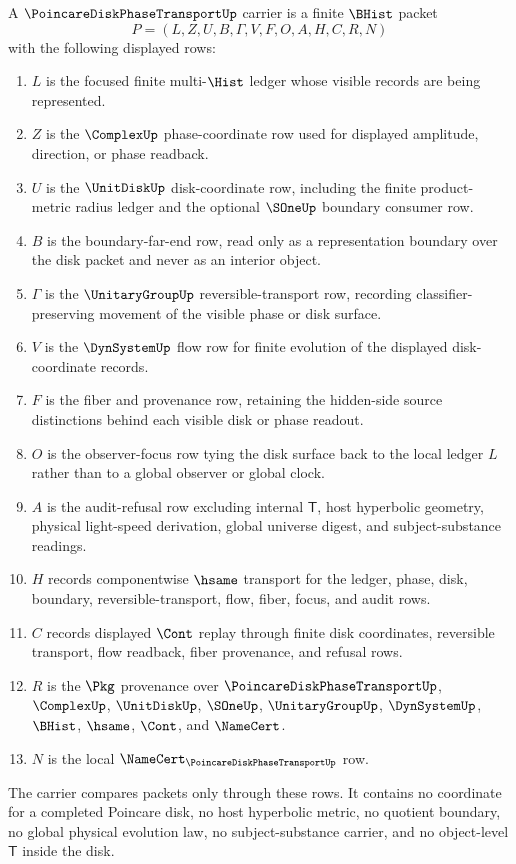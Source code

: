 \begin{definition}
\label{def:poincare-disk-phase-transport-carrier}
A $\PoincareDiskPhaseTransportUp$ carrier is a finite $\BHist$ packet
$$
P=(L,Z,U,B,\Gamma,V,F,O,A,H,C,R,N)
$$
with the following displayed rows:
\begin{enumerate}
\item $L$ is the focused finite multi-$\Hist$ ledger whose visible records are being represented.
\item $Z$ is the $\ComplexUp$ phase-coordinate row used for displayed amplitude, direction, or phase readback.
\item $U$ is the $\UnitDiskUp$ disk-coordinate row, including the finite product-metric radius ledger and the optional $\SOneUp$ boundary consumer row.
\item $B$ is the boundary-far-end row, read only as a representation boundary over the disk packet and never as an interior object.
\item $\Gamma$ is the $\UnitaryGroupUp$ reversible-transport row, recording classifier-preserving movement of the visible phase or disk surface.
\item $V$ is the $\DynSystemUp$ flow row for finite evolution of the displayed disk-coordinate records.
\item $F$ is the fiber and provenance row, retaining the hidden-side source distinctions behind each visible disk or phase readout.
\item $O$ is the observer-focus row tying the disk surface back to the local ledger $L$ rather than to a global observer or global clock.
\item $A$ is the audit-refusal row excluding internal $\mathsf{T}$, host hyperbolic geometry, physical light-speed derivation, global universe digest, and subject-substance readings.
\item $H$ records componentwise $\hsame$ transport for the ledger, phase, disk, boundary, reversible-transport, flow, fiber, focus, and audit rows.
\item $C$ records displayed $\Cont$ replay through finite disk coordinates, reversible transport, flow readback, fiber provenance, and refusal rows.
\item $R$ is the $\Pkg$ provenance over $\PoincareDiskPhaseTransportUp$, $\ComplexUp$, $\UnitDiskUp$, $\SOneUp$, $\UnitaryGroupUp$, $\DynSystemUp$, $\BHist$, $\hsame$, $\Cont$, and $\NameCert$.
\item $N$ is the local $\NameCert_{\PoincareDiskPhaseTransportUp}$ row.
\end{enumerate}
The carrier compares packets only through these rows. It contains no coordinate for a completed Poincare disk, no host hyperbolic metric, no quotient boundary, no global physical evolution law, no subject-substance carrier, and no object-level $\mathsf{T}$ inside the disk.
\end{definition}

